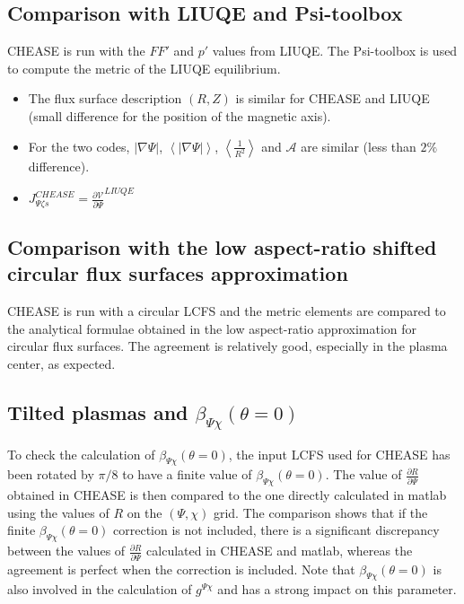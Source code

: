 \documentclass[a4paper,12pt]{article}
\begin{document}
\begin{itemize}
\end{itemize}

\subsection{Comparison with LIUQE and Psi-toolbox}
CHEASE is run with the $FF'$ and $p'$ values from LIUQE. The Psi-toolbox is used to compute the metric of the LIUQE equilibrium.
\begin{itemize}
 \item The flux surface description $(R,Z)$ is similar for CHEASE and LIUQE (small difference for the position of the magnetic axis).
 \item For the two codes, $\left| \nabla \Psi\right|$, $\left<\left| \nabla \Psi\right|\right>$, $\left<\frac{1}{R^2}\right>$ and $\mathcal{A}$ are similar (less than $2\%$ difference).
 \item $J_{\Psi \zeta s}^{CHEASE}=\frac{\partial \mathcal{V}}{\partial \Psi}^{LIUQE}$
\end{itemize}

\subsection{Comparison with the low aspect-ratio shifted circular flux surfaces approximation}
CHEASE is run with a circular LCFS and the metric elements are compared to the analytical formulae obtained in the low aspect-ratio approximation for circular flux surfaces. The agreement is relatively good, especially in the plasma center, as expected.

\subsection{Tilted plasmas and $\beta_{\Psi \chi}\left(\theta=0\right)$}
To check the calculation of $\beta_{\Psi \chi}\left(\theta=0\right)$, the input LCFS used for CHEASE has been rotated by $\pi/8$ to have a finite value of $\beta_{\Psi \chi}\left(\theta=0\right)$. The value of $\frac{\partial R}{\partial {\Psi}}$ obtained in CHEASE is then compared to the one directly calculated in matlab using the values of $R$ 
on the $(\Psi, \chi)$ grid. The comparison shows that if the finite $\beta_{\Psi \chi}\left(\theta=0\right)$ correction is not included, there is a significant discrepancy between the values of $\frac{\partial R}{\partial {\Psi}}$ calculated in CHEASE and matlab, whereas the agreement is perfect when the correction is included.
Note that $\beta_{\Psi \chi}\left(\theta=0\right)$ is also involved in the calculation of $g^{\Psi\chi}$ and has a strong impact on this parameter.
\end{document}
